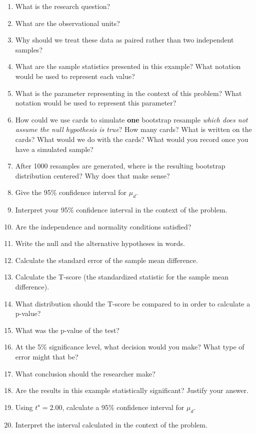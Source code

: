 \documentclass[
]{report}
\newcommand{\rgs}{\vspace{12pt}} %
\begin{document}
\begin{enumerate}
\def\labelenumi{\arabic{enumi}.}
\item
  What is the research question?
  \rgs
\item
  What are the observational units?
  \rgs
\item
  Why should we treat these data as paired rather than two independent samples?
  \rgs
\item
  What are the sample statistics presented in this example? What notation would be used to represent each value?
  \rgs
\item
  What is the parameter representing in the context of this problem? What notation would be used to represent this parameter?
  \rgs
  \rgs
\item
  How could we use cards to simulate \textbf{one} bootstrap resample \emph{which does not assume the null hypothesis is true}? How many cards? What is written on the cards? What would we do with the cards? What would you record once you have a simulated sample?
  \rgs
  \rgs
  \rgs
\item
  After 1000 resamples are generated, where is the resulting bootstrap distribution centered? Why does that make sense?
  \rgs
  \rgs
\item
  Give the 95\% confidence interval for \(\mu_d\).
  \rgs
\item
  Interpret your 95\% confidence interval in the context of the problem.
  \rgs
  \rgs
\item
  Are the independence and normality conditions satisfied?
  \rgs
  \rgs
\item
  Write the null and the alternative hypotheses in words.
  \rgs
  \rgs
\item
  Calculate the standard error of the sample mean difference.
  \rgs
  \rgs
\item
  Calculate the T-score (the standardized statistic for the sample mean difference).
  \rgs
  \rgs
\item
  What distribution should the T-score be compared to in order to calculate a p-value?
  \rgs
\item
  What was the p-value of the test?
  \rgs
\item
  At the 5\% significance level, what decision would you make? What type of error might that be?
  \rgs
\item
  What conclusion should the researcher make?
  \rgs
  \rgs
\item
  Are the results in this example statistically significant? Justify your answer.
  \rgs
\item
  Using \(t^\star=2.00\), calculate a 95\% confidence interval for \(\mu_d\).
  \rgs
  \rgs
\item
  Interpret the interval calculated in the context of the problem.
  \rgs
  \rgs
\end{enumerate}
\end{document}
